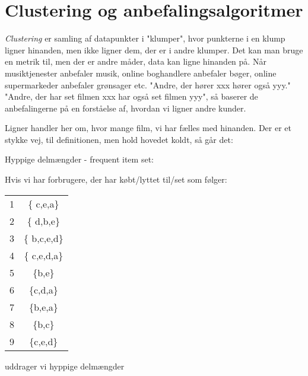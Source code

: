 \documentclass[a4paper, 12pt]{article}
\theoremstyle{remark}
\begin{document}
\section*{Clustering og anbefalingsalgoritmer}

\emph{Clustering} er samling af datapunkter i "klumper", hvor punkterne i en klump ligner hinanden, men ikke ligner dem, der er i andre klumper. Det kan man bruge en metrik til, men der er andre måder, data kan ligne hinanden på. Når musiktjenester anbefaler musik, online boghandlere anbefaler bøger, online supermarkeder anbefaler grønsager etc. "Andre, der hører xxx hører også yyy." "Andre, der har set filmen xxx har også set filmen yyy", så baserer de anbefalingerne på en forståelse af, hvordan vi ligner andre kunder. 

Ligner handler her om, hvor mange film, vi har fælles med hinanden. Der er et stykke vej, til definitionen, men hold hovedet koldt, så går det:

Hyppige delmængder - frequent item set:

Hvis vi har forbrugere, der har købt/lyttet til/set som følger:
\begin{center}
\begin{tabular}{cc}
1 & \{ c,e,a\} \\
2 & \{ d,b,e\} \\
3 & \{ b,c,e,d\} \\
4& \{ c,e,d,a\} \\
5& \{b,e\} \\
6& \{c,d,a\} \\
7&\{b,e,a\} \\
8& \{b,c\} \\
9& \{c,e,d\} 

\end{tabular}
\end{center}
uddrager vi hyppige delmængder
\end{document}
